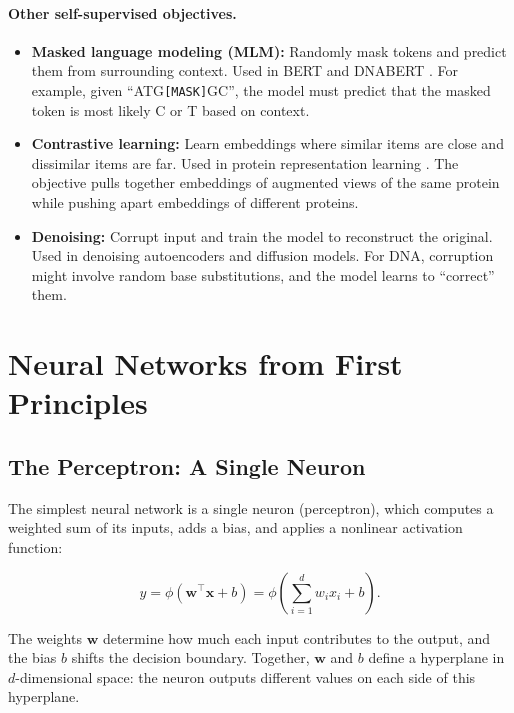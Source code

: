 \paragraph{Other self-supervised objectives.}
\begin{itemize}[leftmargin=1.5em]
  \item \textbf{Masked language modeling (MLM):} Randomly mask tokens and predict them from surrounding context. Used in BERT \citep{devlin2019} and DNABERT \citep{ji2021dnabert}. For example, given ``ATG\texttt{[MASK]}GC'', the model must predict that the masked token is most likely C or T based on context.
  \item \textbf{Contrastive learning:} Learn embeddings where similar items are close and dissimilar items are far. Used in protein representation learning \citep{lin2023}. The objective pulls together embeddings of augmented views of the same protein while pushing apart embeddings of different proteins.
  \item \textbf{Denoising:} Corrupt input and train the model to reconstruct the original. Used in denoising autoencoders and diffusion models. For DNA, corruption might involve random base substitutions, and the model learns to ``correct'' them.
\end{itemize}

\section{Neural Networks from First Principles}
\label{sec:neural-networks}

\subsection{The Perceptron: A Single Neuron}

The simplest neural network is a single neuron (perceptron), which computes a weighted sum of its inputs, adds a bias, and applies a nonlinear activation function:

\begin{equation}
y = \phi(\mathbf{w}^\top \mathbf{x} + b) = \phi\!\left(\sum_{i=1}^d w_i x_i + b\right).
\end{equation}

The weights $\mathbf{w}$ determine how much each input contributes to the output, and the bias $b$ shifts the decision boundary. Together, $\mathbf{w}$ and $b$ define a hyperplane in $d$-dimensional space: the neuron outputs different values on each side of this hyperplane.

